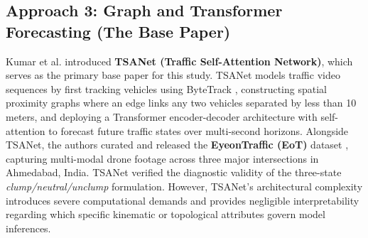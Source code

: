 \documentclass[conference]{IEEEtran}
\begin{document}
\subsection{Approach 3: Graph and Transformer Forecasting (The Base Paper)}
Kumar et al. \cite{kumar2024tsanet} introduced \textbf{TSANet (Traffic Self-Attention Network)}, which serves as the primary base paper for this study. TSANet models traffic video sequences by first tracking vehicles using ByteTrack \cite{zhang2022bytetrack}, constructing spatial proximity graphs where an edge links any two vehicles separated by less than 10 meters, and deploying a Transformer encoder-decoder architecture with self-attention \cite{vaswani2017attention} to forecast future traffic states over multi-second horizons. Alongside TSANet, the authors curated and released the \textbf{EyeonTraffic (EoT)} dataset \cite{eot_repo}, capturing multi-modal drone footage across three major intersections in Ahmedabad, India. TSANet verified the diagnostic validity of the three-state \textit{clump/neutral/unclump} formulation. However, TSANet's architectural complexity introduces severe computational demands and provides negligible interpretability regarding which specific kinematic or topological attributes govern model inferences.
\end{document}
